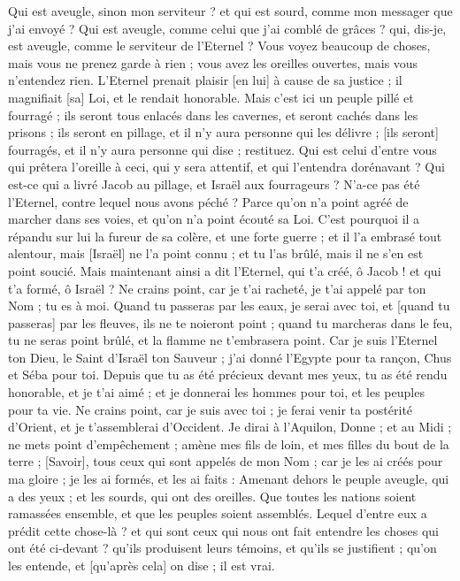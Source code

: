 \begin{multicols}{2}
Qui est aveugle, sinon mon serviteur ? et qui est sourd, comme mon messager que j'ai envoyé ? Qui est aveugle, comme celui que j'ai comblé de grâces ? qui, dis-je, est aveugle, comme le serviteur de l'Eternel ?
Vous voyez beaucoup de choses, mais vous ne prenez garde à rien ; vous avez les oreilles ouvertes, mais vous n'entendez rien.
L'Eternel prenait plaisir [en lui] à cause de sa justice ; il magnifiait [sa] Loi, et le rendait honorable.
Mais c'est ici un peuple pillé et fourragé ; ils seront tous enlacés dans les cavernes, et seront cachés dans les prisons ; ils seront en pillage, et il n'y aura personne qui les délivre ; [ils seront] fourragés, et il n'y aura personne qui dise ; restituez.
Qui est celui d'entre vous qui prêtera l'oreille à ceci, qui y sera attentif, et qui l'entendra dorénavant ?
Qui est-ce qui a livré Jacob au pillage, et Israël aux fourrageurs ? N'a-ce pas été l'Eternel, contre lequel nous avons péché ? Parce qu'on n'a point agréé de marcher dans ses voies, et qu'on n'a point écouté sa Loi.
C'est pourquoi il a répandu sur lui la fureur de sa colère, et une forte guerre ; et il l'a embrasé tout alentour, mais [Israël] ne l'a point connu ; et tu l'as brûlé, mais il ne s'en est point soucié.
\VerseOne{}Mais maintenant ainsi a dit l'Eternel, qui t'a créé, ô Jacob ! et qui t'a formé, ô Israël ? Ne crains point, car je t'ai racheté, je t'ai appelé par ton Nom ; tu es à moi.
Quand tu passeras par les eaux, je serai avec toi, et [quand tu passeras] par les fleuves, ils ne te noieront point ; quand tu marcheras dans le feu, tu ne seras point brûlé, et la flamme ne t'embrasera point.
Car je suis l'Eternel ton Dieu, le Saint d'Israël ton Sauveur ; j'ai donné l'Egypte pour ta rançon, Chus et Séba pour toi.
Depuis que tu as été précieux devant mes yeux, tu as été rendu honorable, et je t'ai aimé ; et je donnerai les hommes pour toi, et les peuples pour ta vie.
Ne crains point, car je suis avec toi ; je ferai venir ta postérité d'Orient, et je t'assemblerai d'Occident.
Je dirai à l'Aquilon, Donne ; et au Midi ; ne mets point d'empêchement ; amène mes fils de loin, et mes filles du bout de la terre ;
[Savoir], tous ceux qui sont appelés de mon Nom ; car je les ai créés pour ma gloire ; je les ai formés, et les ai faits :
Amenant dehors le peuple aveugle, qui a des yeux ; et les sourds, qui ont des oreilles.
Que toutes les nations soient ramassées ensemble, et que les peuples soient assemblés. Lequel d'entre eux a prédit cette chose-là ? et qui sont ceux qui nous ont fait entendre les choses qui ont été ci-devant ? qu'ils produisent leurs témoins, et qu'ils se justifient ; qu'on les entende, et [qu'après cela] on dise ; il est vrai.

\end{multicols}
